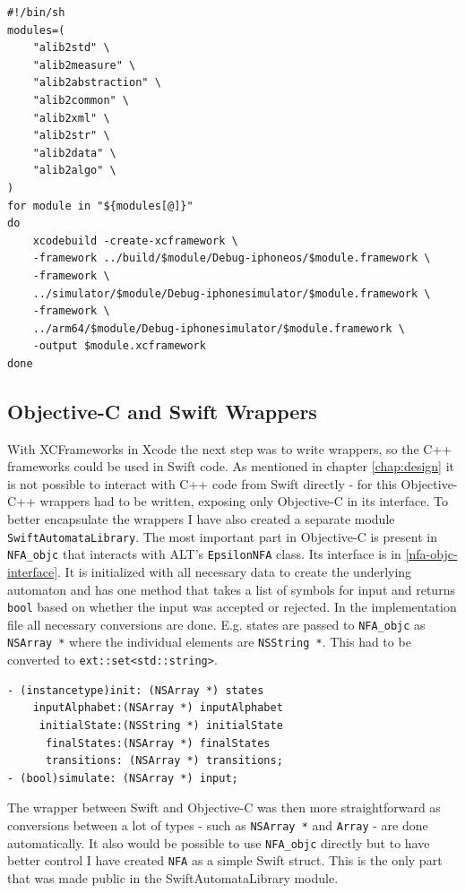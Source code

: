 \begin{lstlisting}[caption=XCFramework shell script, label=xcframework-bundle]
#!/bin/sh
modules=(
    "alib2std" \
    "alib2measure" \
    "alib2abstraction" \
    "alib2common" \
    "alib2xml" \
    "alib2str" \
    "alib2data" \
    "alib2algo" \
)
for module in "${modules[@]}"
do
    xcodebuild -create-xcframework \
    -framework ../build/$module/Debug-iphoneos/$module.framework \
    -framework \
    ../simulator/$module/Debug-iphonesimulator/$module.framework \
    -framework \
    ../arm64/$module/Debug-iphonesimulator/$module.framework \
    -output $module.xcframework
done
\end{lstlisting}

\subsection{Objective-C and Swift Wrappers}

With XCFrameworks in Xcode the next step was to write wrappers, so the C++ frameworks could be used in Swift code. As mentioned in chapter \ref{chap:design} it is not possible to interact with C++ code from Swift directly - for this Objective-C++ wrappers had to be written, exposing only Objective-C in its interface. To better encapsulate the wrappers I have also created a separate module \lstinline{SwiftAutomataLibrary}. The most important part in Objective-C is present in \lstinline{NFA_objc} that interacts with ALT's \lstinline{EpsilonNFA} class. Its interface is in \ref{nfa-objc-interface}. It is initialized with all necessary data to create the underlying automaton and has one method that takes a list of symbols for input and returns \lstinline{bool} based on whether the input was accepted or rejected. In the implementation file all necessary conversions are done. E.g. states are passed to \lstinline{NFA_objc} as \lstinline{NSArray *} where the individual elements are \lstinline{NSString *}. This had to be converted to \lstinline{ext::set<std::string>}.

\begin{lstlisting}[caption={NFA\_objc interface}, label=nfa-objc-interface]
- (instancetype)init: (NSArray *) states
    inputAlphabet:(NSArray *) inputAlphabet
     initialState:(NSString *) initialState
      finalStates:(NSArray *) finalStates
      transitions: (NSArray *) transitions;
- (bool)simulate: (NSArray *) input;
\end{lstlisting}

The wrapper between Swift and Objective-C was then more straightforward as conversions between a lot of types - such as \lstinline{NSArray *} and \lstinline{Array} - are done automatically. It also would be possible to use \lstinline{NFA_objc} directly but to have better control I have created \lstinline{NFA} as a simple Swift struct. This is the only part that was made public in the SwiftAutomataLibrary module.

